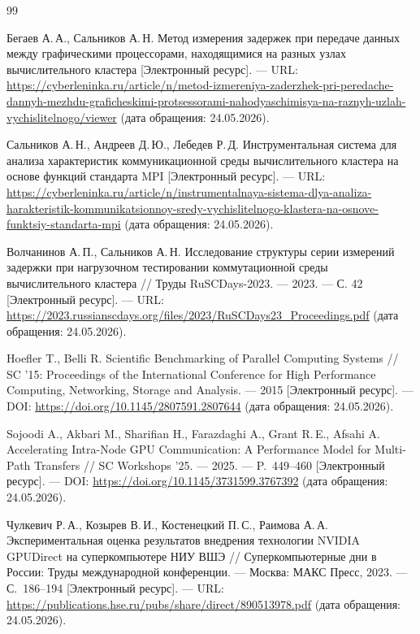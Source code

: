 \documentclass[a4paper,14pt]{extarticle}
\begin{document}
\begin{thebibliography}{99}

	Бегаев А.\,А., Сальников А.\,Н. Метод измерения задержек при передаче данных между графическими процессорами, находящимися на разных узлах вычислительного кластера [Электронный ресурс]. --- URL: \url{https://cyberleninka.ru/article/n/metod-izmereniya-zaderzhek-pri-peredache-dannyh-mezhdu-graficheskimi-protsessorami-nahodyaschimisya-na-raznyh-uzlah-vychislitelnogo/viewer} (дата обращения: 24.05.2026).

	Сальников А.\,Н., Андреев Д.\,Ю., Лебедев Р.\,Д. Инструментальная система для анализа характеристик коммуникационной среды вычислительного кластера на основе функций стандарта MPI [Электронный ресурс]. --- URL: \url{https://cyberleninka.ru/article/n/instrumentalnaya-sistema-dlya-analiza-harakteristik-kommunikatsionnoy-sredy-vychislitelnogo-klastera-na-osnove-funktsiy-standarta-mpi} (дата обращения: 24.05.2026).

	Волчанинов А.\,П., Сальников А.\,Н. Исследование структуры серии измерений задержки при нагрузочном тестировании коммутационной среды вычислительного кластера // Труды RuSCDays-2023. --- 2023. --- С. 42 [Электронный ресурс]. --- URL: \url{https://2023.russianscdays.org/files/2023/RuSCDays23_Proceedings.pdf} (дата обращения: 24.05.2026).

	Hoefler T., Belli R. Scientific Benchmarking of Parallel Computing Systems // SC '15: Proceedings of the International Conference for High Performance Computing, Networking, Storage and Analysis. --- 2015 [Электронный ресурс]. --- DOI: \url{https://doi.org/10.1145/2807591.2807644} (дата обращения: 24.05.2026).

	Sojoodi A., Akbari M., Sharifian H., Farazdaghi A., Grant R.\,E., Afsahi A. Accelerating Intra-Node GPU Communication: A Performance Model for Multi-Path Transfers // SC Workshops '25. --- 2025. --- P.~449--460 [Электронный ресурс]. --- DOI: \url{https://doi.org/10.1145/3731599.3767392} (дата обращения: 24.05.2026).

	Чулкевич Р.\,А., Козырев В.\,И., Костенецкий П.\,С., Раимова А.\,А. Экспериментальная оценка результатов внедрения технологии NVIDIA GPUDirect на суперкомпьютере НИУ ВШЭ // Суперкомпьютерные дни в России: Труды международной конференции. --- Москва: МАКС Пресс, 2023. --- С.~186--194 [Электронный ресурс]. --- URL: \url{https://publications.hse.ru/pubs/share/direct/890513978.pdf} (дата обращения: 24.05.2026).


\end{thebibliography}
\end{document}
